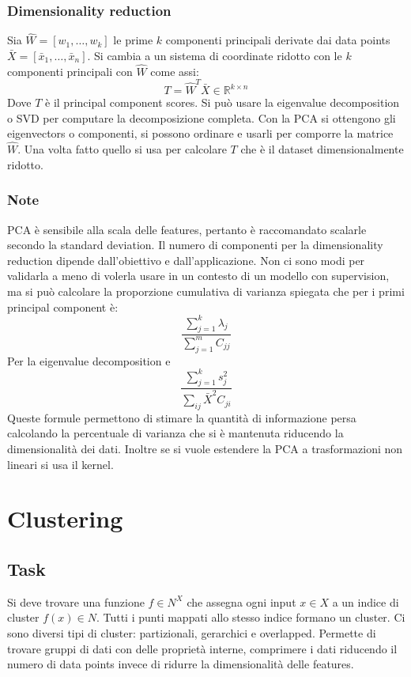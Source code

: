 		\subsubsection{Dimensionality reduction}
		Sia $\hat{W} = [w_1,\dots,w_k]$ le prime $k$ componenti principali derivate dai data points $\bar{X} = [\bar{x}_1,\dots,\bar{x}_n]$.
		Si cambia a un sistema di coordinate ridotto con le $k$ componenti principali con $\hat{W}$ come assi:
		$$T = \hat{W}^T\bar{X}\in\mathbb{R}^{k\times n}$$
		Dove $T$ \`e il principal component scores.
		Si pu\`o usare la eigenvalue decomposition o SVD per computare la decomposizione completa.
		Con la PCA si ottengono gli eigenvectors o componenti, si possono ordinare e usarli per comporre la matrice $\hat{W}$.
		Una volta fatto quello si usa per calcolare $T$ che \`e il dataset dimensionalmente ridotto.

		\subsubsection{Note}
		PCA \`e sensibile alla scala delle features, pertanto \`e raccomandato scalarle secondo la standard deviation.
		Il numero di componenti per la dimensionality reduction dipende dall'obiettivo e dall'applicazione.
		Non ci sono modi per validarla a meno di volerla usare in un contesto di un modello con supervision, ma si pu\`o calcolare la proporzione cumulativa di varianza spiegata che per i primi principal component \`e:
		$$\frac{\sum\limits_{j = 1}^k\lambda_j}{\sum\limits_{j = 1}^m C_{jj}}$$
		Per la eigenvalue decomposition e
		$$\frac{\sum\limits_{j = 1}^ks^2_j}{\sum\limits_{ij} \bar{X}^2C_{ji}}$$
		Queste formule permettono di stimare la quantit\`a di informazione persa calcolando la percentuale di varianza che si \`e mantenuta riducendo la dimensionalit\`a dei dati.
		Inoltre se si vuole estendere la PCA a trasformazioni non lineari si usa il kernel.

\section{Clustering}

	\subsection{Task}
	Si deve trovare una funzione $f\in N^X$ che assegna ogni input $x\in X$ a un indice di cluster $f(x)\in N$.
	Tutti i punti mappati allo stesso indice formano un cluster.
	Ci sono diversi tipi di cluster: partizionali, gerarchici e overlapped.
	Permette di trovare gruppi di dati con delle propriet\`a interne, comprimere i dati riducendo il numero di data points invece di ridurre la dimensionalit\`a delle features.

